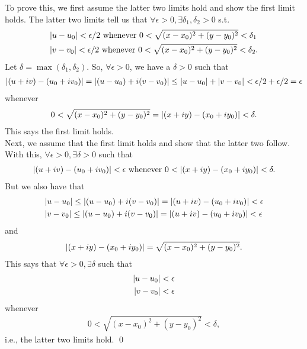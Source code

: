 \documentclass{book}
\theoremstyle{definition}
\begin{document}
To prove this, we first assume the latter two limits hold and show the first limit holds. The latter two limits tell us that $\forall \epsilon > 0, \exists \delta_1, \delta_2 > 0$ s.t. 
\begin{align}
&\abs{u - u_0} < \epsilon/2 \text{ whenever } 0 < \sqrt{(x - x_0)^2 + (y - y_0)^2} < \delta_1\\
&\abs{v - v_0} < \epsilon/2 \text{ whenever } 0 < \sqrt{(x - x_0)^2 + (y - y_0)^2} < \delta_2.
\end{align}
Let $\delta = \max (\delta_1, \delta_2)$. So, $\forall \epsilon > 0$, we have a $\delta > 0$ such that 
\begin{align}
\abs{(u + iv) - (u_0 + iv_0)} = \abs{(u - u_0) + i(v-v_0)} \leq \abs{u - u_0} + \abs{v - v_0} < \epsilon/2 + \epsilon/2 = \epsilon
\end{align}
whenever 
\begin{align}
0 < \sqrt{(x - x_0)^2 + (y - y_0)^2} = \abs{(x + iy) - (x_0 + iy_0)} < \delta.
\end{align}
This says the first limit holds.\\

Next, we assume that the first limit holds and show that the latter two follow. With this, $\forall \epsilon > 0, \exists \delta > 0$ such that 
\begin{align}
\abs{ (u + iv) - (u_0 + iv_0)} < \epsilon \text{ whenever } 0 < \abs{ (x + iy) - (x_0 + iy_0)} < \delta.
\end{align} 
But we also have that 
\begin{align}
&\abs{u - u_0} \leq \abs{(u - u_0) + i(v - v_0)} = \abs{ (u + iv) - (u_0 + iv_0)} < \epsilon\\
&\abs{v - v_0} \leq \abs{(u - u_0) + i(v - v_0)} = \abs{ (u + iv) - (u_0 + iv_0)} < \epsilon
\end{align}
and
\begin{align}
\abs{ (x + iy) - (x_0 + iy_0)} = \sqrt{(x - x_0)^2 + (y - y_0)^2}.
\end{align}
This says that $\forall \epsilon> 0, \exists \delta$ such that
\begin{align}
\abs{u - u_0} < \epsilon\\
\abs{v - v_0} < \epsilon
\end{align}
whenever
\begin{align}
0 < \sqrt{(x  -x_0)^2 + (y  - y_0)^2} < \delta,
\end{align}
i.e., the latter two limits hold. \qed
\end{document}
